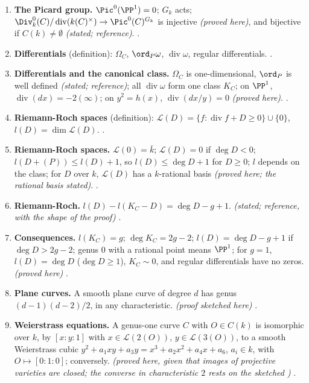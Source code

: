 \begin{enumerate}[label=\textbf{\thechapter.\arabic*}]
\item \textbf{The Picard group.} $\Pic^0(\PP^1)=0$; $G_k$ acts; $\Div^0_k(C)/\operatorname{div}(k(C)^\times)\to\Pic^0(C)^{G_k}$ is injective \emph{(proved here)}, and bijective if $C(k)\ne\emptyset$
\emph{(stated; reference)}. .
\item \textbf{Differentials} (definition): $\Omega_C$, $\ord_P\omega$, $\operatorname{div}\omega$, regular differentials. .
\item \textbf{Differentials and the canonical class.} $\Omega_C$ is one-dimensional, $\ord_P$ is well defined \emph{(stated; reference)}; all $\operatorname{div}\omega$ form one class $K_C$; on $\PP^1$,
$\operatorname{div}(dx)=-2(\infty)$; on $y^2=h(x)$, $\operatorname{div}(dx/y)=0$ \emph{(proved here)}. .
\item \textbf{Riemann-Roch spaces} (definition): $\mathcal L(D)=\{f:\operatorname{div}f+D\ge0\}\cup\{0\}$, $l(D)=\dim\mathcal L(D)$. .
\item \textbf{Riemann-Roch spaces.} $\mathcal L(0)=\bar k$; $\mathcal L(D)=0$ if $\deg D<0$; $l(D+(P))\le l(D)+1$, so $l(D)\le\deg D+1$ for $D\ge0$; $l$ depends on the class; for $D$ over $k$,
$\mathcal L(D)$ has a $k$-rational basis \emph{(proved here; the rational basis stated)}. .
\item \textbf{Riemann-Roch.} $l(D)-l(K_C-D)=\deg D-g+1$. \emph{(stated; reference, with the shape of the proof)} .
\item \textbf{Consequences.} $l(K_C)=g$; $\deg K_C=2g-2$; $l(D)=\deg D-g+1$ if $\deg D>2g-2$; genus $0$ with a rational point means $\PP^1$; for $g=1$, $l(D)=\deg D$ ($\deg D\ge1$), $K_C\sim0$, and
regular differentials have no zeros. \emph{(proved here)} .
\item \textbf{Plane curves.} A smooth plane curve of degree $d$ has genus $(d-1)(d-2)/2$, in any characteristic. \emph{(proof sketched here)} .
\item \textbf{Weierstrass equations.} A genus-one curve $C$ with $O\in C(k)$ is isomorphic over $k$, by $[x:y:1]$ with $x\in\mathcal L(2(O))$, $y\in\mathcal L(3(O))$, to a smooth Weierstrass cubic
$y^2+a_1xy+a_3y=x^3+a_2x^2+a_4x+a_6$, $a_i\in k$, with $O\mapsto[0:1:0]$; conversely. \emph{(proved here, given that images of projective varieties are closed;
the converse in characteristic $2$ rests on the sketched )} .

\end{enumerate}
